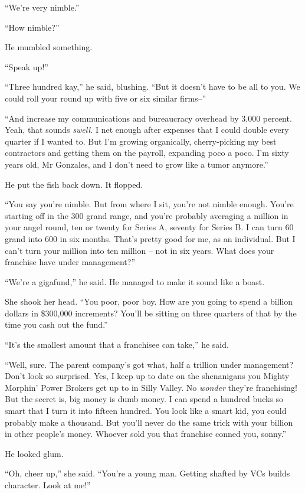 “We're very nimble.”

“How nimble?”

He mumbled something.

“Speak up!”

“Three hundred kay,” he said, blushing. “But it doesn't have to 
be all to you. We could roll your round up with five or six similar 
firms--”

“And increase my communications and bureaucracy overhead by 3,000 
percent. Yeah, that sounds \emph{swell.} I net enough after expenses 
that I could double every quarter if I wanted to. But I'm growing 
organically, cherry-picking my best contractors and getting them on the 
payroll, expanding poco a poco. I'm sixty years old, Mr Gonzales, and I 
don't need to grow like a tumor anymore.”

He put the fish back down. It flopped.

“You say you're nimble. But from where I sit, you're not nimble 
enough. You're starting off in the 300 grand range, and you're probably 
averaging a million in your angel round, ten or twenty for Series A, 
seventy for Series B. I can turn 60 grand into 600 in six months. 
That's pretty good for me, as an individual. But I can't turn your 
million into ten million -- not in six years. What does your franchise 
have under management?”

“We're a gigafund,” he said. He managed to make it sound like a 
boast.

She shook her head. “You poor, poor boy. How are you going to spend a 
billion dollars in \$300,000 increments? You'll be sitting on three 
quarters of that by the time you cash out the fund.”

“It's the smallest amount that a franchisee can take,” he said.

“Well, sure. The parent company's got what, half a trillion under 
management? Don't look so surprised. Yes, I keep up to date on the 
shenanigans you Mighty Morphin' Power Brokers get up to in Silly 
Valley. No \emph{wonder} they're franchising! But the secret is, big 
money is dumb money. I can spend a hundred bucks so smart that I turn 
it into fifteen hundred. You look like a smart kid, you could probably 
make a thousand. But you'll never do the same trick with your billion 
in other people's money. Whoever sold you that franchise conned you, 
sonny.”

He looked glum.

“Oh, cheer up,” she said. “You're a young man. Getting shafted by 
VCs builds character. Look at me!”

